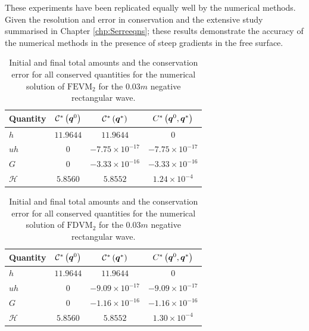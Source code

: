 These experiments have been replicated equally well by the numerical methods. Given the resolution and error in conservation and the extensive study summarised in Chapter \ref{chp:Serreeqns}; these results demonstrate the accuracy of the numerical methods in the presence of steep gradients in the free surface.
%
\begin{table}
	\centering
	\begin{tabular}{l  c  c c}
		Quantity& $\mathcal{C}^*\left(\boldsymbol{q}^0\right)$ & $\mathcal{C}^*\left(\boldsymbol{q}^*\right)$ & ${C}^*\left(\boldsymbol{q}^0,\boldsymbol{q}^*\right)$ \B \\
		\hline 
		$h$ & $11.9644$ & $11.9644$ & $0$ \T\\
		$uh$ & $0$ & $-7.75 \times 10^{-17}$ & $-7.75\times 10^{-17}$\\
		$G$ & $0$ & $-3.33\times 10^{-16}$ & $-3.33\times 10^{-16}$\\
		$\mathcal{H}$ & $5.8560$ & $5.8552$ & $1.24 \times 10^{-4}$  \B \\
		\hline
	\end{tabular}
	\caption{Initial and final total amounts and the conservation error for all conserved quantities for the numerical solution of $\text{FEVM}_2$ for the $0.03m$ negative rectangular wave.}
	\label{tab:ConservationSegurFEVM3cm}
\end{table} 
%
\begin{table}
	\centering
	\begin{tabular}{l  c  c c}
		Quantity& $\mathcal{C}^*\left(\boldsymbol{q}^0\right)$ & $\mathcal{C}^*\left(\boldsymbol{q}^*\right)$ & ${C}^*\left(\boldsymbol{q}^0,\boldsymbol{q}^*\right)$ \B \\
		\hline
		$h$ & $11.9644$ & $11.9644$ & $0$ \T\\
		$uh$ & $0$ & $-9.09 \times 10^{-17}$ & $-9.09 \times 10^{-17}$\\
		$G$ & $0$ & $-1.16\times 10^{-16}$ & $-1.16\times 10^{-16}$\\
		$\mathcal{H}$ & $5.8560$ & $5.8552$ & $1.30 \times 10^{-4}$ \B\\
		\hline
	\end{tabular}
	\caption{Initial and final total amounts and the conservation error for all conserved quantities for the numerical solution of $\text{FDVM}_2$ for the $0.03m$ negative rectangular wave.}
	\label{tab:ConservationSegurFDVM3cm}
\end{table}  

